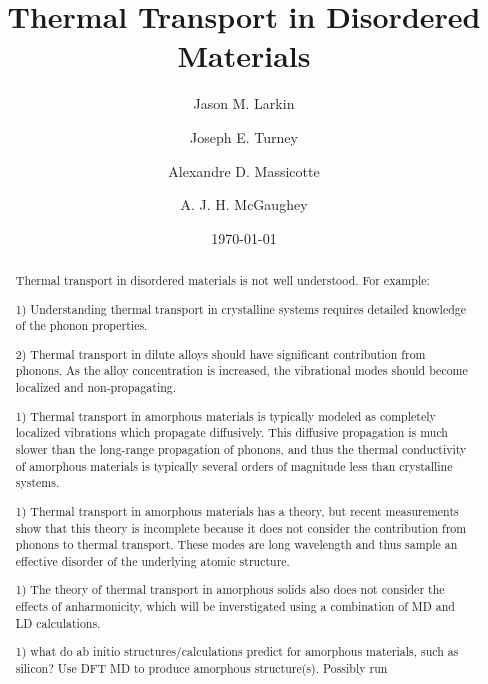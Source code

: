 \documentclass[letterpaper,12pt]{article}
\begin{document}
\title{Thermal Transport in Disordered Materials}

\author{Jason M. Larkin}
\author{Joseph E. Turney}
\author{Alexandre D. Massicotte}
\author{A. J. H. McGaughey}

\date{\today}

\begin{abstract}
Thermal transport in disordered materials is not well understood.  For example:


1) Understanding thermal transport in crystalline systems requires detailed knowledge of the phonon properties.

2) Thermal transport in dilute alloys should have significant contribution from phonons.  As the alloy concentration is increased, the vibrational modes should become localized and non-propagating.

1) Thermal transport in amorphous materials is typically modeled as completely localized vibrations which propagate diffusively.\cite{allen1993}  This diffusive propagation is much slower than the long-range propagation of phonons, and thus the thermal conductivity of amorphous materials is typically several orders of magnitude less than crystalline systems.\cite{freeman1986,cahill1992}

1) Thermal transport in amorphous materials has a theory, but recent measurements show that this theory
is incomplete because it does not consider the contribution from phonons to thermal transport.\cite{he2011} These modes are long wavelength and thus sample an effective disorder of the underlying atomic structure.

1) The theory of thermal transport in amorphous solids also does not consider the effects of anharmonicity, which will be inverstigated using a combination of MD and LD calculations.\cite{cahill1987}

1) what do ab initio structures/calculations predict for amorphous materials, such as silicon? Use DFT MD to produce amorphous structure(s). Possibly run

\end{abstract}


\maketitle
\end{document}
